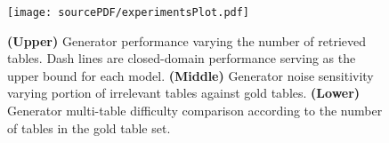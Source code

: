 

\begin{figure}[ht]
\centering
\texttt{[image: sourcePDF/experimentsPlot.pdf]}
\caption{\textbf{(Upper)} Generator performance varying the number of retrieved tables. Dash lines are closed-domain performance serving as the upper bound for each model. \textbf{(Middle)} Generator noise sensitivity varying portion of irrelevant tables against gold tables. \textbf{(Lower)} Generator multi-table difficulty comparison according to the number of tables in the gold table set.}
\label{fig:plot_exp}
\end{figure}